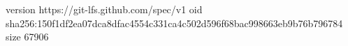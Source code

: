 version https://git-lfs.github.com/spec/v1
oid sha256:150f1df2ea07dca8dfac4554c331ca4c502d596f68bac998663eb9b76b796784
size 67906
